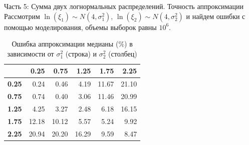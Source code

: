 \documentclass[ucs, notheorems, handout]{beamer}
\begin{document}
	\begin{frame}{Часть 5: Сумма двух логнормальных распределений. Точность аппроксимации }
		Рассмотрим $\ln(\xi_{1}) \sim N(4, \sigma _{1}^{2})$, $\ln(\xi_{2}) \sim N(4, \sigma _{2}^{2})$ и найдем ошибки с помощью моделирования, объемы выборок равны $10^{6}$.
		
		
		\begin{table}[ht]
			\centering
			\caption{Ошибка аппроксимации медианы ($\%$) в зависимости от $\sigma_{1}^{2}$ (строка) и $\sigma_{2}^{2}$ (столбец)}
			\begin{tabular}{rrrrrr}
				\hline
				& \textbf{0.25} & \textbf{0.75} & \textbf{1.25} & \textbf{1.75} & \textbf{2.25} \\ 
				\hline
				\textbf{0.25} & 0.24 & 0.46 & 4.19 & 11.67 & 21.10 \\ 
				\textbf{0.75} & 0.74 & 0.40 & 3.06 & 11.46 & 20.99 \\ 
				\textbf{1.25} & 4.25 & 3.27 & 2.48 & 6.18 & 16.15 \\ 
				\textbf{1.75} & 12.18 & 10.12 & 5.57 & 5.24 & 9.92 \\ 
				\textbf{2.25} & 20.94 & 20.20 & 16.29 & 9.59 & 8.47 \\ 
				\hline
			\end{tabular}
		\end{table}
		
	\end{frame}
	
\end{document}
